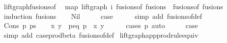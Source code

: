 \begin{isabellebody}
\endisatagproof
{\isafoldproof}%
%
\isadelimproof
\isanewline
%
\endisadelimproof
\isanewline
\isanewline
{}\isamarkupfalse%
\ lift{\isacharunderscore}{\kern0pt}graph{\isacharunderscore}{\kern0pt}fusions{\isacharunderscore}{\kern0pt}of{\isacharcolon}{\kern0pt}\isanewline
\ \ {\isachardoublequoteopen}map\ {\isacharparenleft}{\kern0pt}lift{\isacharunderscore}{\kern0pt}graph\ i{\isacharparenright}{\kern0pt}\ {\isacharparenleft}{\kern0pt}fusions{\isacharunderscore}{\kern0pt}of\ fusions{\isacharparenright}{\kern0pt}\ {\isacharequal}{\kern0pt}\ fusions{\isacharunderscore}{\kern0pt}of\ fusions{\isachardoublequoteclose}\isanewline
%
\isadelimproof
%
\endisadelimproof
%
\isatagproof
{}\isamarkupfalse%
\ {\isacharparenleft}{\kern0pt}induction\ fusions{\isacharparenright}{\kern0pt}\isanewline
\ \ \isamarkupfalse%
\ Nil\isanewline
\ \ \isamarkupfalse%
\ \isamarkupfalse%
\ {\isacharquery}{\kern0pt}case\isanewline
\ \ \ \ \isamarkupfalse%
\ {\isacharparenleft}{\kern0pt}simp\ add{\isacharcolon}{\kern0pt}\ fusions{\isacharunderscore}{\kern0pt}of{\isacharunderscore}{\kern0pt}def{\isacharparenright}{\kern0pt}\isanewline
{}\isamarkupfalse%
\isanewline
\ \ \isamarkupfalse%
\ {\isacharparenleft}{\kern0pt}Cons\ p\ ps{\isacharparenright}{\kern0pt}\isanewline
\ \ \isamarkupfalse%
\ x\ y\ \ p{\isacharunderscore}{\kern0pt}eq{\isacharcolon}{\kern0pt}\ {\isachardoublequoteopen}p\ {\isacharequal}{\kern0pt}\ {\isacharparenleft}{\kern0pt}x{\isacharcomma}{\kern0pt}\ y{\isacharparenright}{\kern0pt}{\isachardoublequoteclose}\isanewline
\ \ \ \ \isamarkupfalse%
\ {\isacharparenleft}{\kern0pt}cases\ p{\isacharparenright}{\kern0pt}\ auto\isanewline
\ \ \isamarkupfalse%
\ \isamarkupfalse%
\ {\isacharquery}{\kern0pt}case\isanewline
\ \ \ \ \isamarkupfalse%
\ {\isacharparenleft}{\kern0pt}simp\ add{\isacharcolon}{\kern0pt}\ case{\isacharunderscore}{\kern0pt}prod{\isacharunderscore}{\kern0pt}beta\ fusions{\isacharunderscore}{\kern0pt}of{\isacharunderscore}{\kern0pt}def{\isacharparenright}{\kern0pt}\isanewline
{}\isamarkupfalse%
%
\endisatagproof
{\isafoldproof}%
%
\isadelimproof
\isanewline
%
\endisadelimproof
\isanewline
\isanewline
{}\isamarkupfalse%
\ lift{\isacharunderscore}{\kern0pt}graph{\isacharunderscore}{\kern0pt}app{\isacharunderscore}{\kern0pt}prodrule{\isacharunderscore}{\kern0pt}equiv{\isacharcolon}{\kern0pt}\isanewline

\end{isabellebody}
